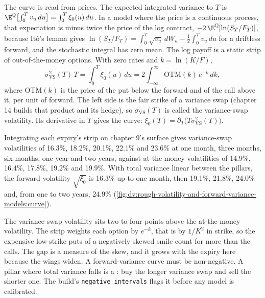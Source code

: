 The curve is read from prices. The expected integrated variance to $T$ is
$\E^{\mathbb Q}\bigl[\int_0^Tv_u\,du\bigr]=\int_0^T\xi_0(u)\,du$. In a model where the price is a continuous
process, that expectation is minus twice the price of the log contract,
$-2\,\E^{\mathbb Q}[\ln(S_T/F_T)]$, because Itô's lemma gives
$\ln(S_T/F_T)=\int_0^T\sqrt{v_u}\,dW_u-\frac12\int_0^Tv_u\,du$ for a driftless forward, and the stochastic
integral has zero mean. The log payoff is a static strip of out-of-the-money options. With zero rates and
$k=\ln(K/F)$,
\[
\sigma_{\mathrm{VS}}^2(T)\,T=\int_0^T\xi_0(u)\,du=2\int_{-\infty}^{\infty}\mathrm{OTM}(k)\,e^{-k}\,dk,
\]
where $\mathrm{OTM}(k)$ is the price of the put below the forward and of the call above it, per unit of forward.
The left side is the fair strike of a variance swap (chapter 14 builds that product and its hedge), so
$\sigma_{\mathrm{VS}}(T)$ is called the variance-swap volatility. Its derivative in $T$ gives the curve:
$\xi_0(T)=\partial_T\bigl(T\sigma_{\mathrm{VS}}^2(T)\bigr)$.

\begin{example}\label{ex:dv:rough-volatility-and-forward-variance-models:curve}
Integrating each expiry's strip on chapter 9's surface gives variance-swap volatilities of 16.3\%, 18.2\%,
20.1\%, 22.1\% and 23.6\% at one month, three months, six months, one year and two years, against at-the-money
volatilities of 14.9\%, 16.4\%, 17.8\%, 19.2\% and 19.9\%. With total variance linear between the pillars,
the forward volatility $\sqrt{\xi_0}$ is 16.3\% up to one month, then 19.1\%, 21.8\%, 24.0\% and, from one to
two years, 24.9\% (\cref{fig:dv:rough-volatility-and-forward-variance-models:curve}).
\end{example}

The variance-swap volatility sits two to four points above the at-the-money volatility. The strip weights
each option by $e^{-k}$, that is by $1/K^2$ in strike, so the expensive low-strike puts of a negatively
skewed smile count for more than the calls. The gap is a measure of the skew, and it grows with the expiry
here because the wings widen. A forward-variance curve must be non-negative. A pillar where total variance
falls is a : buy the longer variance swap and sell the shorter one. The build's
\texttt{negative\_intervals} flags it before any model is calibrated.

